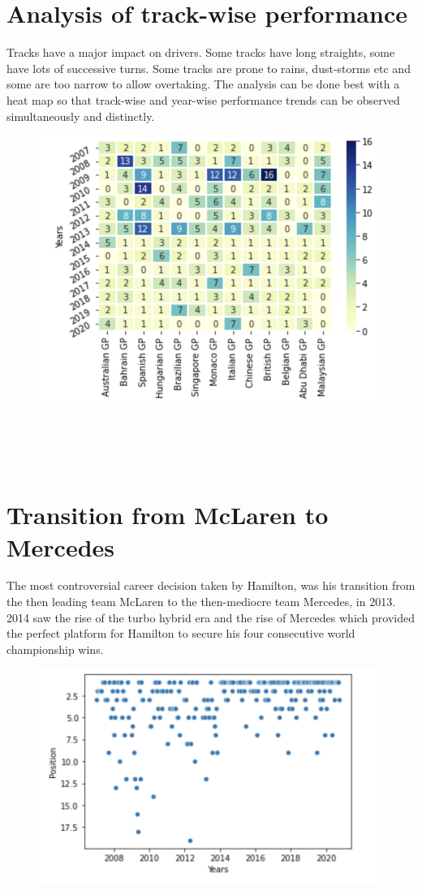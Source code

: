 \documentclass{article}
\begin{document}
\section{Analysis of track-wise performance}
Tracks have a major impact on drivers. Some tracks have long straights, some have lots of successive turns. Some tracks are prone to rains, dust-storms etc and some are too narrow to allow overtaking. The analysis can be done best with a heat map so that track-wise and year-wise performance trends can be observed simultaneously and distinctly.
\begin{figure}[h!]
\centering
\includegraphics[scale=0.75]{track}
\caption{}
\label{fig:track}
\end{figure}\\\\\\
\section{Transition from McLaren to Mercedes}
The most controversial career decision taken by Hamilton, was his transition from the then leading team McLaren to the then-mediocre team Mercedes, in 2013. 2014 saw the rise of the turbo hybrid era and the rise of Mercedes which provided the perfect platform for Hamilton to secure his four consecutive world championship wins.
\begin{figure}[h!]
\centering
\includegraphics[scale=0.8]{scatter}
\caption{}
\label{fig:scatter}
\end{figure}
\end{document}
